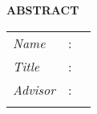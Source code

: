 \begin{center}
  \large\textbf{ABSTRACT}
\end{center}

\vspace{2ex}

\begingroup
\setlength{\tabcolsep}{0pt}

\noindent
\begin{tabularx}{\textwidth}{l >{\centering}m{3em} X}
  \emph{Name}     & : & \name{}         \\

  \emph{Title}    & : & \engtatitle{}   \\

  \emph{Advisor}    & : & \advisor{}   \\

  \\
\end{tabularx}
\endgroup




